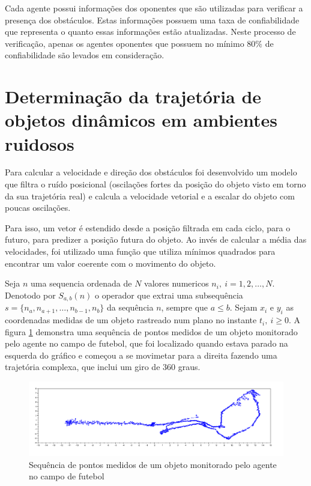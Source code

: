 Cada agente possui informações dos oponentes que são utilizadas para verificar a presença dos obstáculos. Estas informações 
possuem uma taxa de confiabilidade que representa o quanto essas informações estão atualizadas. Neste processo de verificação, 
apenas os agentes oponentes que possuem no mínimo $80\%$ de confiabilidade são levados em consideração.

\section{Determinação da trajetória de objetos dinâmicos em ambientes ruidosos}
\label{sec:calcvel}

Para calcular a velocidade e direção dos obstáculos foi desenvolvido um modelo que filtra o ruído posicional (oscilações fortes da posição 
do objeto visto em torno da sua trajetória real) e calcula a velocidade vetorial e a escalar do objeto com poucas oscilações.

Para isso, um vetor é estendido desde a posição filtrada em cada ciclo, para o futuro, para predizer a posição futura do objeto.
Ao invés de calcular a média das velocidades, foi utilizado uma função que utiliza mínimos quadrados \cite{minQuad} 
para encontrar um valor coerente com o movimento do objeto.

Seja $n$ uma sequencia ordenada de $N$ valores numericos $n_{i},\: i=1,2,\ldots,N$.
Denotodo por $S_{a,b}(n)$ o operador que extrai uma subsequência $s=\{n_{a},n_{a+1},\ldots,n_{b-1},n_{b}\}$
da sequência $n$, sempre que $a\leq b$. Sejam $x_{i}$ e $y_{i}$
as coordenadas medidas de um objeto rastreado num plano no instante
$t_{i},\: i\geq0$. A figura \ref{fig:Sequ=0000EAncia-de-pontos-medidos}
demonstra uma sequência de pontos medidos de um objeto monitorado
pelo agente no campo de futebol, que foi localizado quando estava
parado na esquerda do gráfico e começou a se movimetar para a direita
fazendo uma trajetória complexa, que inclui um giro de $360$ graus.

\begin{figure}[!htb]
\includegraphics[scale=0.45]{figuras/fig_pontos_medidos}
\caption{\label{fig:Sequ=0000EAncia-de-pontos-medidos}Sequência de pontos
medidos de um objeto monitorado pelo agente no campo de futebol }
\end{figure}

